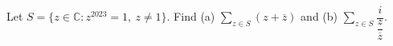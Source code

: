 Let $ S=\{z\in\mathbb C:z^{2023}=1,\ z\ne1\}$. Find (a) $\sum_{z\in S}(z+\overline z)$ and (b) $\sum_{z\in S}\dfrac{i}{\dfrac{z}{\overline z}}$.
